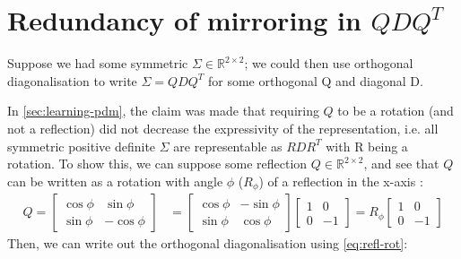 \documentclass[a4paper, 12pt]{report}
\begin{document}
\section{Redundancy of mirroring in $QDQ^T$}
\label{sec:red-mirr}
Suppose we had some symmetric $\Sigma \in \mathbb{R}^{2\times 2}$; we could then use orthogonal diagonalisation to write $\Sigma = QDQ^T$ for some orthogonal Q and diagonal D.

In \ref{sec:learning-pdm}, the claim was made that requiring $Q$ to be a rotation (and not a reflection) did not decrease the expressivity of the representation, i.e. all symmetric positive definite $\Sigma$ are representable as $RDR^T$ with R being a rotation. To show this, we can suppose some reflection $Q\in \mathbb{R}^{2\times 2}$, and see that $Q$ can be written as a rotation with angle $\phi$ ($R_\phi$) of a reflection in the x-axis \cite{poole2015linear}:
\begin{align}
	Q=\begin{bmatrix}
		\cos \phi  &  \sin \phi  \\
		\sin \phi  &  -\cos \phi
	\end{bmatrix} &= \begin{bmatrix}
		\cos \phi  &  -\sin \phi  \\
		\sin \phi  &  \cos \phi
	\end{bmatrix} \begin{bmatrix}
		1  &  0  \\
		0  &  -1
	\end{bmatrix} = R_\phi \begin{bmatrix}
		1  &  0  \\
		0  &  -1
	\end{bmatrix} \label{eq:refl-rot}
\end{align}
Then, we can write out the orthogonal diagonalisation using \ref{eq:refl-rot}:
\end{document}
